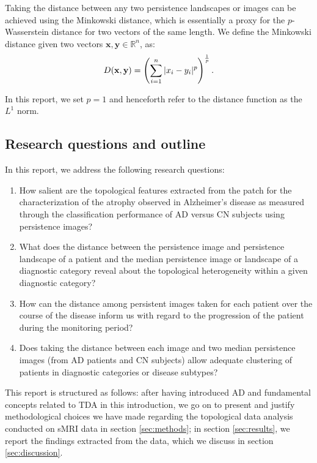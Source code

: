 \documentclass{article}
\begin{document}
Taking the distance between any two persistence landscapes or images can be achieved using the
Minkowski distance, which is essentially a proxy for the $p$-Wasserstein distance for two vectors of
the same length. We define the Minkowski distance given two vectors
$\mathbf{x},\mathbf{y}\in\mathbb{R}^n$, as:
\begin{equation}
  \label{eq:minkowski}
  D(\mathbf{x},\mathbf{y}) = \left(\sum_{i=1}^{n}|x_i-y_i|^p\right)^{1\over p}.
\end{equation}

In this report, we set $p=1$ and henceforth refer to the distance function as the $L^1$ norm.

\subsection{Research questions and outline}

In this report, we address the following research questions:

\begin{enumerate}
\item How salient are the topological features extracted from the patch for the characterization of
  the atrophy observed in Alzheimer's disease as measured through the classification performance of
AD versus CN subjects using persistence images?
\item What does the distance between the persistence image and persistence
landscape of a patient and the median persistence image or landscape of a
diagnostic category reveal about the topological heterogeneity within a given
diagnostic category?
\item How can the distance among persistent images taken for each patient over the course of the
  disease inform us with regard to the progression of the patient during the monitoring period?
\item Does taking the distance between each image and two median persistence
images (from AD patients and CN subjects) allow adequate clustering of patients
in diagnostic categories or disease subtypes?
\end{enumerate}

This report is structured as follows: after having introduced AD and fundamental concepts related to
TDA in this introduction, we go on to present and justify methodological choices we have made
regarding the topological data analysis conducted on sMRI data in section \ref{sec:methods}; in
section \ref{sec:results}, we report the findings extracted from the data, which we discuss in
section \ref{sec:discussion}.
\end{document}
